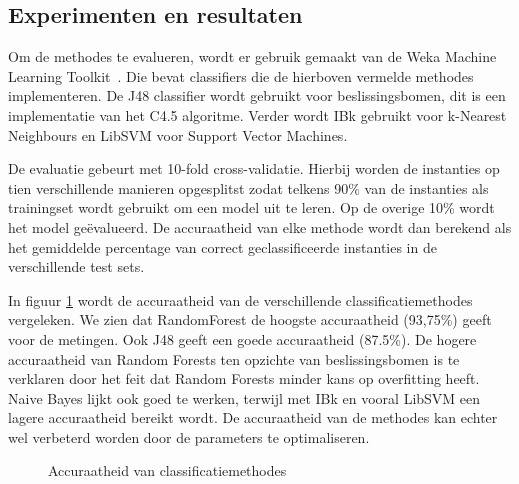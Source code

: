 \documentclass{article}
\begin{document}
\subsection{Experimenten en resultaten}
\label{afzonderlijk:experimenten}

Om de methodes te evalueren, wordt er gebruik gemaakt van de Weka Machine Learning Toolkit~\cite{waikato:weka}.
Die bevat classifiers die de hierboven vermelde methodes implementeren. De J48 classifier wordt gebruikt voor beslissingsbomen, dit is een implementatie van het C4.5 algoritme.
Verder wordt IBk gebruikt voor k-Nearest Neighbours en LibSVM voor Support Vector Machines.

De evaluatie gebeurt met 10-fold cross-validatie. Hierbij worden de instanties op tien verschillende manieren opgesplitst zodat telkens 90\% van de instanties als trainingset wordt gebruikt om een model uit te leren. Op de overige 10\% wordt het model ge\"evalueerd. De accuraatheid van elke methode wordt dan berekend als het gemiddelde percentage van correct geclassificeerde instanties in de verschillende test sets.

In figuur \ref{fig:methodes}
wordt de accuraatheid van de verschillende classificatiemethodes vergeleken. We zien dat RandomForest de hoogste accuraatheid (93,75\%) geeft voor de metingen. Ook J48 geeft een goede accuraatheid (87.5\%). De hogere accuraatheid van Random Forests ten opzichte van beslissingsbomen is te verklaren door het feit dat Random Forests minder kans op overfitting heeft.~\cite{breiman:randomforests} Naive Bayes lijkt ook goed te werken, terwijl met IBk en vooral LibSVM een lagere accuraatheid bereikt wordt. De accuraatheid van de methodes kan echter wel verbeterd worden door de parameters te optimaliseren.

\begin{figure}[h]
\centering
{}
\caption{Accuraatheid van classificatiemethodes}
\label{fig:methodes}
\end{figure}
\end{document}
